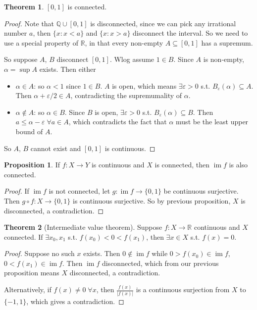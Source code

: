 \documentclass[a4paper,11pt]{article}
\theoremstyle{definition}
\newtheorem*{prop}{Proposition}
\newtheorem*{thm}{Theorem}
\DeclareMathOperator{\im}{im}
\numberwithin{equation}{section}
\begin{document}
\begin{thm}
$[0,1]$ is connected.
\end{thm}

\begin{proof}
Note that $\mathbb{Q}\cup[0,1]$ is disconnected, since we can pick any irrational number $a$, then $\{x:x<a\}$ and $\{x:x>a\}$ disconnect the interval. So we need to use a special property of $\mathbb{R}$, in that every non-empty $A\subseteq[0,1]$ has a supremum.

So suppose $A$, $B$ disconnect $[0,1]$. Wlog assume $1\in B$. Since $A$ is non-empty, $\alpha=\sup A$ exists. Then either
\begin{itemize}
    \item $\alpha\in A$: so $\alpha<1$ since $1\in B$. $A$ is open, which means $\exists\varepsilon>0$ s.t. $B_\varepsilon(\alpha)\subseteq A$. Then $\alpha+\varepsilon/2\in A$, contradicting the supremumality of $\alpha$.
    \item $\alpha\notin A$: so $\alpha\in B$. Since $B$ is open, $\exists\varepsilon>0$ s.t. $B_\varepsilon(\alpha)\subseteq B$. Then $a\leq\alpha-\varepsilon\;\forall a\in A$, which contradicts the fact that $\alpha$ must be the least upper bound of $A$.
\end{itemize}
So $A$, $B$ cannot exist and $[0,1]$ is continuous.
\end{proof}

\begin{prop}
    If $f:X\rightarrow Y$ is continuous and $X$ is connected, then $\im f$ is also connected.
\end{prop}

\begin{proof}
If $\im f$ is not connected, let $g:\im f\rightarrow\{0,1\}$ be continuous surjective. Then $g\circ f:X\rightarrow\{0,1\}$ is continuous surjective. So by previous proposition, $X$ is disconnected, a contradiction.
\end{proof}

\begin{thm}[Intermediate value theorem]
Suppose $f:X\rightarrow\mathbb{R}$ continuous and $X$ connected. If $\exists x_0,x_1$ s.t. $f(x_0)<0<f(x_1)$, then $\exists x\in X$ s.t. $f(x)=0$.
\end{thm}

\begin{proof}
Suppose no such $x$ exists. Then $0\notin \im f$ while $0>f(x_0)\in\im f$, $0<f(x_1)\in\im f$. Then $\im f$ disconnected, which from our previous proposition means $X$ disconnected, a contradiction.

Alternatively, if $f(x)\neq0\;\forall x$, then $\frac{f(x)}{|f(x)|}$ is a continuous surjection from $X$ to $\{-1,1\}$, which gives a contradiction.
\end{proof}
\end{document}
